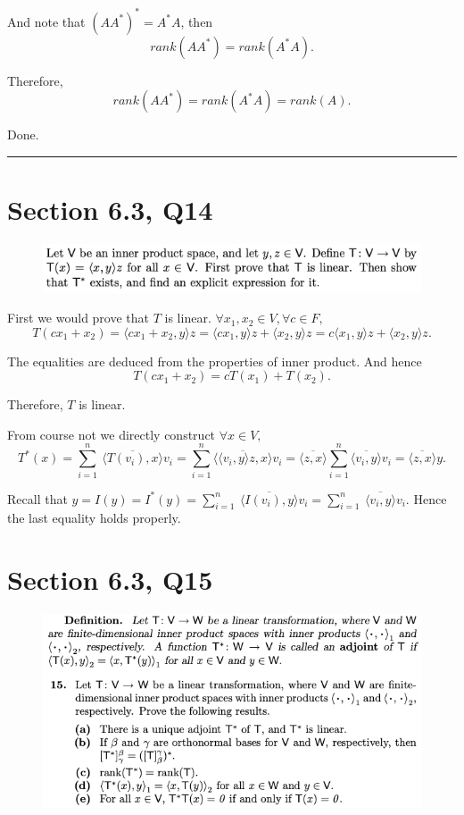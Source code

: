 \documentclass[12pt]{article}%
\begin{document}
And note that $(AA^*)^* =A^*A$, then $$rank(AA^*)=rank(A^*A).$$

Therefore, $$rank(AA^*)=rank(A^*A)=rank(A).$$

Done.


\noindent\rule[0.1ex]{\linewidth}{1pt}


\section{Section 6.3, Q14}
\begin{figure}[htp]
    \centering %
    \includegraphics[width = 16cm]{img/Q3.png}
\end{figure}

First we would prove that $T$ is linear. $\forall x_1,x_2 \in V, \forall c \in F,$
$$T(cx_1+x_2)=\langle cx_1+x_2,y \rangle z = \langle cx_1,y \rangle z + \langle x_2,y \rangle z=c\langle x_1,y \rangle z+\langle x_2,y \rangle z.$$

The equalities are deduced from the properties of inner product. And hence $$T(cx_1+x_2)=cT(x_1)+T(x_2).$$

Therefore, $T$ is linear. 

From course not we directly construct $\forall x \in V,$ 
$$T^*(x)=\sum_{i=1}^n\ \overline{\langle T(v_i),x \rangle}v_i
=\sum_{i=1}^n \overline{ \langle \langle v_i,y \rangle z, x \rangle }v_i
=\overline{\langle z,x \rangle} \sum_{i=1}^n \overline{\langle v_i,y \rangle} v_i=\overline{\langle z,x \rangle}y.$$

Recall that $y=I(y)=I^*(y)=\sum_{i=1}^n\ \overline{\langle I(v_i),y \rangle}v_i=\sum_{i=1}^n\ \overline{\langle v_i,y \rangle}v_i.$ Hence the last 
equality holds properly.


\newpage

\section{Section 6.3, Q15}
\begin{figure}[htp]
    \centering %
    \includegraphics[width = 17cm]{img/Q4.png}
\end{figure}
\end{document}

